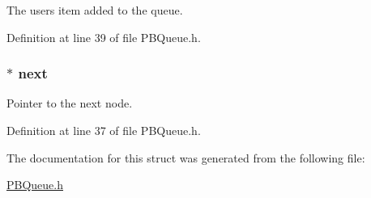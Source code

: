 The user\textquotesingle{}s item added to the queue. 



Definition at line 39 of file P\+B\+Queue.\+h.

\hypertarget{struct_p_b_q___node_afe40ce6cc59853da2df37681483060b4}{}
\subsubsection[{next}]{$\ast$ next}\label{struct_p_b_q___node_afe40ce6cc59853da2df37681483060b4}


Pointer to the next node. 



Definition at line 37 of file P\+B\+Queue.\+h.



The documentation for this struct was generated from the following file\+:\begin{DoxyCompactItemize}
\item 
\hyperlink{_p_b_queue_8h}{P\+B\+Queue.\+h}\end{DoxyCompactItemize}
